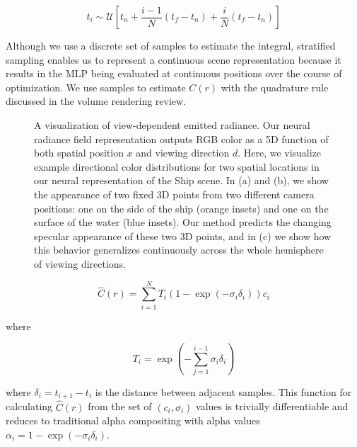 \documentclass[12pt]{article}
\begin{document}
\begin{equation}
    t_i \sim \mathcal{U}[t_n + \frac{i-1}{N}(t_f - t_n) + \frac{i}{N}(t_f - t_n)]
\end{equation}

Although we use a discrete set of samples to estimate the integral, stratified sampling enables us to represent a continuous scene representation
because it results in the MLP being evaluated at continuous positions over the course of optimization. 
We use samples to estimate $C(r)$ with the quadrature rule discussed in the volume rendering review.

\begin{figure}
    A visualization of view-dependent emitted radiance. Our neural radiance field representation outputs RGB color as a 5D function of both spatial position 
    $x$ and viewing direction $d$. Here, we visualize example directional color distributions for two spatial locations in our neural representation of the Ship scene. 
    In (a) and (b), we show the appearance of two fixed 3D points from two different camera positions: one on the side of the ship (orange insets) and one on the surface of the water (blue insets).
    Our method predicts the changing specular appearance of these two 3D points, and in (c) we show how this behavior generalizes continuously across the whole hemisphere of viewing directions. 
\end{figure}

\begin{equation}
    \hat{C}(r) = \sum_{i=1}^{N} T_i (1 - \exp (- {\sigma}_i {\delta}_i)) c_i 
\end{equation}

where

\begin{equation}
    T_i = \exp (- \sum_{j=1}^{i-1} {\sigma}_i {\delta}_i)
\end{equation}

where ${\delta}_i = t_{i+1} - t_i$ is the distance between adjacent samples. 
This function for calculating $\hat{C}(r)$ from the set of $(c_i,{\sigma}_i)$ values is trivially differentiable 
and reduces to traditional alpha compositing with alpha values ${\alpha}_i = 1 - \exp(-{\sigma}_i {\delta}_i)$.

\begin{figure}
\end{figure}
\end{document}
